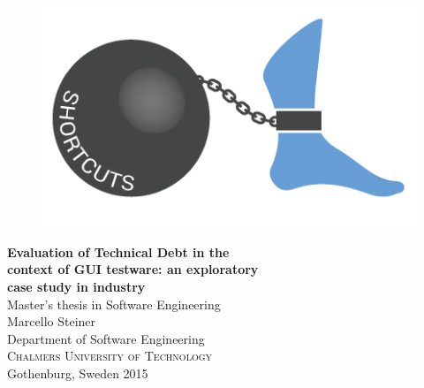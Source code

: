 
\begin{titlepage}

\addtolength{\voffset}{2cm}

\begin{figure}[h]
\centering
\includegraphics[width=\textwidth]{figure/auxiliary/td.png}
\label{fig:technical_debt_trend}
\end{figure}

\mbox{}
\vfill
\renewcommand{\familydefault}{\sfdefault} \normalfont %
\textbf{{\Huge 	Evaluation of Technical Debt in the  	\\[0.2cm]
                context of GUI testware: an exploratory \\[0.2cm]
				case study in industry}} 	\\[0.5cm]
Master's thesis in Software Engineering \\[0.5cm]

{\Large Marcello Steiner}\\[2.5cm]

Department of Software Engineering \\
\textsc{Chalmers University of Technology} \\
Gothenburg, Sweden 2015

\renewcommand{\familydefault}{\rmdefault} \normalfont %
\end{titlepage}


